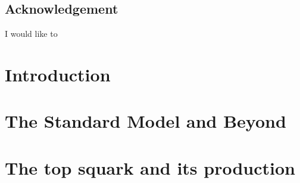 \documentclass[12pt,a4paper]{report}
\begin{document}
\begin{center}
    \section*{\centering \Huge Acknowledgement}
    I would like to 
\end{center}


\begin{center}
    \begin{abstract}
    \noindent 
    \end{abstract}
\end{center}

\clearpage

\tableofcontents
\clearpage

\setcounter{page}{1}

\chapter{Introduction}



\chapter{The Standard Model and Beyond}


\chapter{The top squark and its production}

\end{document}
